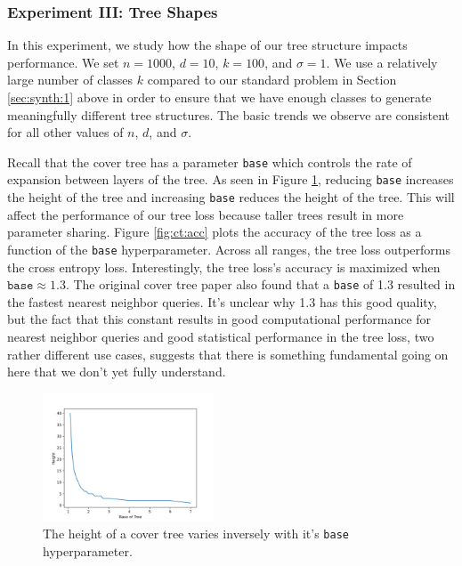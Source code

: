 \documentclass[twoside]{article}
\begin{document}
\subsubsection{Experiment III: Tree Shapes}

In this experiment, we study how the shape of our tree structure impacts performance.
We set $n=1000$, $d=10$, $k=100$, and $\sigma=1$.
We use a relatively large number of classes $k$ compared to our standard problem in Section \ref{sec:synth:1} above in order to ensure that we have enough classes to generate meaningfully different tree structures.
The basic trends we observe are consistent for all other values of $n$, $d$, and $\sigma$.

Recall that the cover tree has a parameter \texttt{base} which controls the rate of expansion between layers of the tree.
As seen in Figure \ref{fig:ct:height}, reducing \texttt{base} increases the height of the tree and increasing \texttt{base} reduces the height of the tree.
This will affect the performance of our tree loss because taller trees result in more parameter sharing.
Figure \ref{fig:ct:acc} plots the accuracy of the tree loss as a function of the \texttt{base} hyperparameter.
Across all ranges, the tree loss outperforms the cross entropy loss.
Interestingly, the tree loss's accuracy is maximized when $\texttt{base}\approx1.3$.
The original cover tree paper \citep{beygelzimer2006cover} also found that a \texttt{base} of 1.3 resulted in the fastest nearest neighbor queries.
It's unclear why 1.3 has this good quality,
but the fact that this constant results in good computational performance for nearest neighbor queries and good statistical performance in the tree loss, two rather different use cases, suggests that there is something fundamental going on here that we don't yet fully understand.

\begin{figure}
            \includegraphics[width=\columnwidth,height=1.5in]{fig/new_img/height_vs_base.png}
            \caption{The height of a cover tree varies inversely with it's \texttt{base} hyperparameter.}
            \label{fig:ct:height}
\end{figure}
\end{document}
